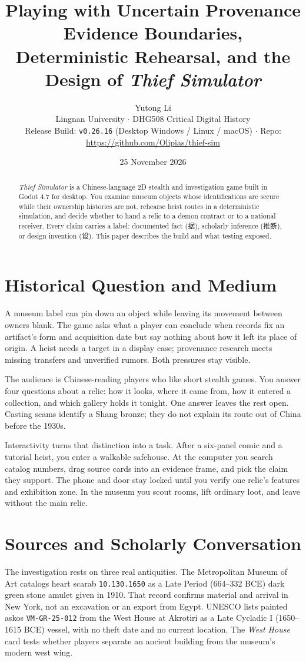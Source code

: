 \documentclass[11pt,a4paper]{article}
\title{\textbf{Playing with Uncertain Provenance}\\[0.25em]
\large Evidence Boundaries, Deterministic Rehearsal, and the Design of \emph{Thief Simulator}}
\author{Yutong Li\\Lingnan University $\cdot$ DHG508 Critical Digital History\\
\small Release Build: \texttt{v0.26.16} (Desktop Windows / Linux / macOS) $\cdot$ Repo: \url{https://github.com/Olipias/thief-sim}}
\date{25 November 2026}
\begin{document}
\maketitle
\begin{abstract}
\noindent
\emph{Thief Simulator} is a Chinese-language 2D stealth and investigation game built in Godot 4.7 for desktop. You examine museum objects whose identifications are secure while their ownership histories are not, rehearse heist routes in a deterministic simulation, and decide whether to hand a relic to a demon contract or to a national receiver. Every claim carries a label: documented fact (据), scholarly inference (推断), or design invention (设). This paper describes the build and what testing exposed.
\end{abstract}
\section{Historical Question and Medium}
A museum label can pin down an object while leaving its movement between owners blank. The game asks what a player can conclude when records fix an artifact's form and acquisition date but say nothing about how it left its place of origin. A heist needs a target in a display case; provenance research meets missing transfers and unverified rumors. Both pressures stay visible.

The audience is Chinese-reading players who like short stealth games. You answer four questions about a relic: how it looks, where it came from, how it entered a collection, and which gallery holds it tonight. One answer leaves the rest open. Casting seams identify a Shang bronze; they do not explain its route out of China before the 1930s.

Interactivity turns that distinction into a task. After a six-panel comic and a tutorial heist, you enter a walkable safehouse. At the computer you search catalog numbers, drag source cards into an evidence frame, and pick the claim they support. The phone and door stay locked until you verify one relic's features and exhibition zone. In the museum you scout rooms, lift ordinary loot, and leave without the main relic.

\section{Sources and Scholarly Conversation}
The investigation rests on three real antiquities. The Metropolitan Museum of Art catalogs heart scarab \texttt{10.130.1650} as a Late Period (664--332 BCE) dark green stone amulet given in 1910.\autocite[Artwork Details]{met} That record confirms material and arrival in New York, not an excavation or an export from Egypt. UNESCO lists painted askos \texttt{VM-GR-25-012} from the West House at Akrotiri as a Late Cycladic I (1650--1615 BCE) vessel, with no theft date and no current location.\autocite[About the object]{unesco} The \emph{West House} card tests whether players separate an ancient building from the museum's modern west wing.
\end{document}
